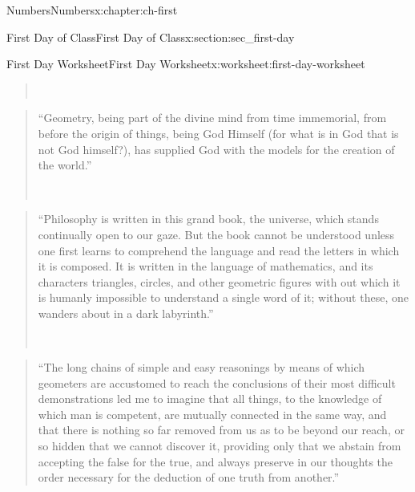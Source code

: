 \documentclass[twoside,10pt,]{book}
\numberwithin{equation}{chapter}
\begin{document}
\begin{chapterptx}{Numbers}{}{Numbers}{}{}{x:chapter:ch-first}
\begin{sectionptx}{First Day of Class}{}{First Day of Class}{}{}{x:section:sec_first-day}
\begin{worksheet-subsection}{First Day Worksheet}{}{First Day Worksheet}{}{}{x:worksheet:first-day-worksheet}
\begin{quote}
\nopagebreak\par%
\hfill{}\\\par
\end{quote}
\begin{quote}%
``Geometry, being part of the divine mind from time immemorial, from before the origin of  things, being God Himself (for what is in God that is not God himself?), has supplied God with the models for the creation of the world.''%
\nopagebreak\par%
\hfill{}\\\par
\end{quote}
\begin{quote}%
``Philosophy is written in this grand book, the universe, which  stands continually open to our gaze.  But the book cannot be understood unless one first learns to comprehend the     language and read the letters in which it is composed. It is written in the language of mathematics, and its characters triangles, circles, and other geometric figures with out which it is humanly impossible to understand a single  word of it; without these, one wanders about in a dark labyrinth.''%
\nopagebreak\par%
\hfill{}\\\par
\end{quote}
\begin{quote}%
``The long chains of simple and easy reasonings by means of which geometers are accustomed to reach the conclusions of their most difficult demonstrations led me to imagine that all things, to the knowledge of which man is competent, are mutually connected in the same way, and that there is nothing so far removed from us as to be beyond our reach, or so hidden that we cannot discover it, providing only that we abstain from accepting the false for the true, and always preserve in our thoughts the order necessary for the deduction of one truth from another.''%

\end{quote}
\end{worksheet-subsection}
\end{sectionptx}
\end{chapterptx}
\end{document}
